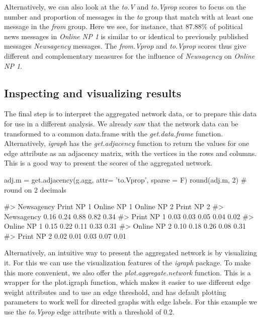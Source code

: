 Alternatively, we can also look at the \emph{to.V} and \emph{to.Vprop}
scores to focus on the number and proportion of messages in the
\emph{to} group that match with at least one message in the \emph{from}
group. Here we see, for instance, that 87.88\% of political news
messages in \emph{Online NP 1} is similar to or identical to previously
published messages \emph{Newsagency} messages. The \emph{from.Vprop} and
\emph{to.Vprop} scores thus give different and complementary measures
for the influence of \emph{Newsagency} on \emph{Online NP 1}.

\subsection{Inspecting and visualizing results}

The final step is to interpret the aggregated network data, or to
prepare this data for use in a different analysis. We already saw that
the network data can be transformed to a common data.frame with the
\emph{get.data.frame} function. Alternatively, \emph{igraph} has the
\emph{get.adjacency} function to return the values for one edge
attribute as an adjacency matrix, with the vertices in the rows and
columns. This is a good way to present the scores of the aggregated
network.

\begin{Schunk}
\begin{Sinput}
adj.m = get.adjacency(g.agg, attr= 'to.Vprop', sparse = F)
round(adj.m, 2) # round on 2 decimals
\end{Sinput}
\begin{Soutput}
#>             Newsagency Print NP 1 Online NP 1 Online NP 2 Print NP 2
#> Newsagency        0.16       0.24        0.88        0.82       0.34
#> Print NP 1        0.03       0.03        0.05        0.04       0.02
#> Online NP 1       0.15       0.22        0.11        0.33       0.31
#> Online NP 2       0.10       0.18        0.26        0.08       0.31
#> Print NP 2        0.02       0.01        0.03        0.07       0.01
\end{Soutput}
\end{Schunk}

Alternatively, an intuitive way to present the aggregated network is by
visualizing it. For this we can use the visualization features of the
\emph{igraph} package. To make this more convenient, we also offer the
\emph{plot.aggregate.network} function. This is a wrapper for the
plot.igraph function, which makes it easier to use different edge weight
attributes and to use an edge threshold, and has default plotting
parameters to work well for directed graphs with edge labels. For this
example we use the \emph{to.Vprop} edge attribute with a threshold of
0.2.

